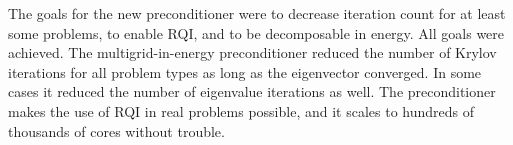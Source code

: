The goals for the new preconditioner were to decrease iteration count for at least some problems, to enable RQI, and to be decomposable in energy. All goals were achieved. The multigrid-in-energy preconditioner reduced the number of Krylov iterations for all problem types as long as the eigenvector converged. In some cases it reduced the number of eigenvalue iterations as well. The preconditioner makes the use of RQI in real problems possible, and it scales to hundreds of thousands of cores without trouble. 



\separatorpage{}








